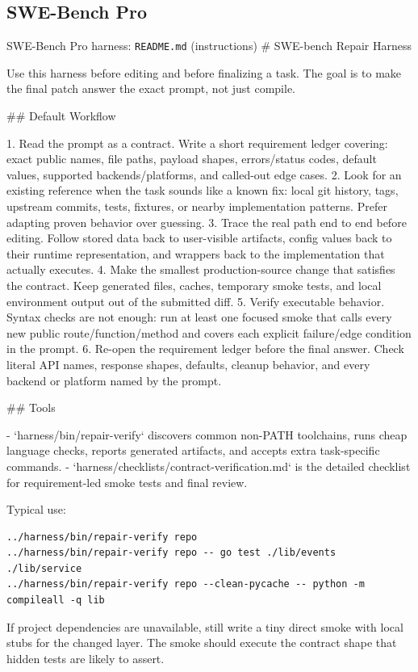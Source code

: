 \documentclass{llmxive}
\begin{document}
\subsection{SWE-Bench Pro}

\begin{promptbox}{SWE-Bench Pro harness: \texttt{README.md} (instructions)}
# SWE-bench Repair Harness

Use this harness before editing and before finalizing a task. The goal is to
make the final patch answer the exact prompt, not just compile.

## Default Workflow

1. Read the prompt as a contract. Write a short requirement ledger covering:
   exact public names, file paths, payload shapes, errors/status codes,
   default values, supported backends/platforms, and called-out edge cases.
2. Look for an existing reference when the task sounds like a known fix:
   local git history, tags, upstream commits, tests, fixtures, or nearby
   implementation patterns. Prefer adapting proven behavior over guessing.
3. Trace the real path end to end before editing. Follow stored data back to
   user-visible artifacts, config values back to their runtime representation,
   and wrappers back to the implementation that actually executes.
4. Make the smallest production-source change that satisfies the contract.
   Keep generated files, caches, temporary smoke tests, and local environment
   output out of the submitted diff.
5. Verify executable behavior. Syntax checks are not enough: run at least one
   focused smoke that calls every new public route/function/method and covers
   each explicit failure/edge condition in the prompt.
6. Re-open the requirement ledger before the final answer. Check literal API
   names, response shapes, defaults, cleanup behavior, and every backend or
   platform named by the prompt.

## Tools

- `harness/bin/repair-verify` discovers common non-PATH toolchains, runs cheap
  language checks, reports generated artifacts, and accepts extra task-specific
  commands.
- `harness/checklists/contract-verification.md` is the detailed checklist for
  requirement-led smoke tests and final review.

Typical use:

\begin{lstlisting}
../harness/bin/repair-verify repo
../harness/bin/repair-verify repo -- go test ./lib/events ./lib/service
../harness/bin/repair-verify repo --clean-pycache -- python -m compileall -q lib
\end{lstlisting}

If project dependencies are unavailable, still write a tiny direct smoke with
local stubs for the changed layer. The smoke should execute the contract shape
that hidden tests are likely to assert.
\end{promptbox}
\end{document}
